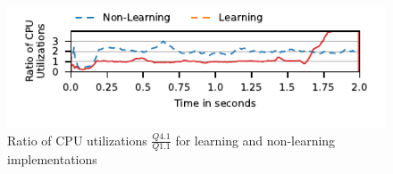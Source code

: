 \begin{figure}[t]
	\centering
	\includegraphics[width=\columnwidth]{figures/q1-q11-ratio-cpu-util.pdf}
	\vspace{-2em}
	\caption{Ratio of CPU utilizations  $\frac{Q4.1}{Q1.1}$ for learning and non-learning 
		implementations}
	\label{fig:non-learning-comparison}
	\vspace{-1.5em}
\end{figure}

